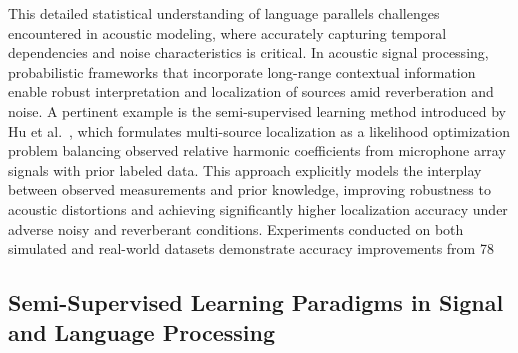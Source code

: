 \documentclass[sigconf]{acmart}
\begin{document}
This detailed statistical understanding of language parallels challenges encountered in acoustic modeling, where accurately capturing temporal dependencies and noise characteristics is critical. In acoustic signal processing, probabilistic frameworks that incorporate long-range contextual information enable robust interpretation and localization of sources amid reverberation and noise. A pertinent example is the semi-supervised learning method introduced by Hu et al.~\cite{ref52}, which formulates multi-source localization as a likelihood optimization problem balancing observed relative harmonic coefficients from microphone array signals with prior labeled data. This approach explicitly models the interplay between observed measurements and prior knowledge, improving robustness to acoustic distortions and achieving significantly higher localization accuracy under adverse noisy and reverberant conditions. Experiments conducted on both simulated and real-world datasets demonstrate accuracy improvements from 78%

\subsection{Semi-Supervised Learning Paradigms in Signal and Language Processing}
\end{document}
